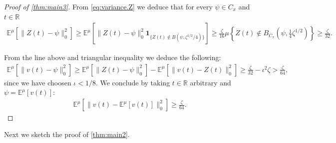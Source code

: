\documentclass[10pt,a4paper]{amsart}
\numberwithin{equation}{section}
\numberwithin{corollario}{section}
\numberwithin{lemma}{section}
\numberwithin{prop}{section}
\theoremstyle{definition}
\theoremstyle{remark}
\newcommand{\R}{\mathbb{R}}
\begin{document}
\begin{proof}[Proof of \autoref{thm:main3}]
From \eqref{eq:variance.Z} we deduce that for every $\psi \in C_x$ and $t \in \R$
\begin{align}
   \mathbb{E}^\mu \left[ \|Z(t)-\psi\|_0^2\right]
   \geq
   \mathbb{E}^\mu \left[ \|Z(t)-\psi\|_0^2 \mathbf{1}_{\{Z(t) \notin B(\psi,\zeta^{1/2}/4)\}} \right]
   \geq \frac{\zeta}{16} \mu \left\{ Z(t) \notin B_{C_x}\left(\psi,\frac14 \zeta^{1/2}\right)  \right\}
   \geq
   \frac{\zeta}{32}. 
\end{align}

From the line above and triangular inequality we deduce the following:
\begin{align}
  \mathbb{E}^\mu \left[ \|v(t)-\psi\|_0^2\right]
  \geq
  \mathbb{E}^\mu \left[ \|Z(t)-\psi\|_0^2\right]
  -
  \mathbb{E}^\mu \left[ \|v(t)-Z(t)\|_0^2\right]
  \geq
  \frac{\zeta}{32} - 
   \iota^2 \zeta
   > \frac{\zeta}{64} ,
\end{align}
since we have choosen $\iota<1/8$. 
We conclude by taking $t \in \R$ arbitrary and $\psi = \mathbb{E}^\mu[v(t)]$:
\begin{align}
    \mathbb{E}^\mu \left[ \|v(t)-\mathbb{E}^\mu[v(t)]\|_0^2\right]
  \geq
  \frac{\zeta}{64}.
\end{align}
\end{proof}

Next we sketch the proof of \autoref{thm:main2}. 
\end{document}
